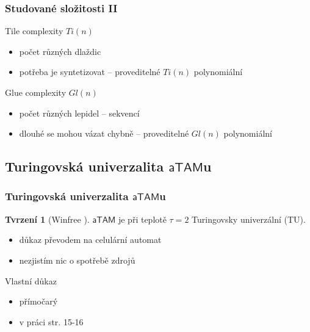 \documentclass[10pt]{beamer}
\newcommand{\atam}{\mathsf{aTAM}}
\theoremstyle{definition}
\newtheorem{tvr}{Tvrzení}
\theoremstyle{remark}
\begin{document}
\begin{frame}
\frametitle{Studované složitosti II}
	Tile complexity $Ti(n)$
	\begin{itemize}
		\item počet různých dlaždic
		\item potřeba je syntetizovat -- proveditelné $Ti(n)$ polynomiální
	\end{itemize}
	Glue complexity $Gl(n)$
	\begin{itemize}
		\item počet různých lepidel -- sekvencí
		\item dlouhé se mohou vázat chybně -- proveditelné $Gl(n)$ polynomiální
	\end{itemize}
\end{frame}

\subsection{Turingovská univerzalita $\atam$u}
\begin{frame}
\frametitle{Turingovská univerzalita $\atam$u}
	\begin{tvr}[Winfree \cite{winfree_phd}]
		$\atam$ je při teplotě $\tau=2$ Turingovsky univerzální (TU).
	\end{tvr}
	\begin{itemize}
		\item důkaz převodem na celulární automat
		\item nezjistím nic o spotřebě zdrojů
	\end{itemize}
	Vlastní důkaz
	\begin{itemize}
		\item přímočarý
		\item v práci str. 15-16
	\end{itemize}
\end{frame}
\end{document}
